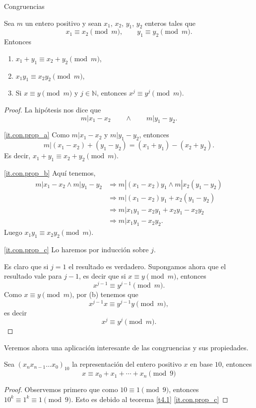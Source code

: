 \begin{section}{Congruencias}
\begin{teorema}\label{t4.1} Sea $m$ un entero positivo y sean $x_1$, $x_2$,
$y_1$, $y_2$ enteros tales que
$$
x_1 \equiv x_2 \pmod{m}, \qquad y_1 \equiv y_2 \pmod{m}.
$$
Entonces
\begin{enumerate}[label=\textit{\alph*)}]
\item\label{it.con.prop_a} $ x_1+ y_1 \equiv x_2+ y_2 \pmod{m}$,
\item\label{it.con.prop_b}  $x_1 y_1 \equiv x_2 y_2 \pmod{m}$,
\item\label{it.con.prop_c}  Si $x \equiv y \pmod{m}$  y $j \in  \mathbb N$, entonces $x^j \equiv y^j \pmod{m}$.
\end{enumerate}
\end{teorema}
\begin{proof}
La hipótesis nos dice que 
\begin{equation*}
    m | x_1 - x_2 \qquad \wedge \qquad m | y_1 - y_2.
\end{equation*}

\ref{it.con.prop_a} Como $m | x_1 - x_2$ y $m | y_1 - y_2$,  entonces 
$$
m |  (x_1 - x_2) + (y_1 - y_2) = (x_1 +y_1) -(x_2+y_2).
$$
Es decir, $ x_1+ y_1 \equiv x_2+ y_2 \pmod{m}$. 

\ref{it.con.prop_b} Aquí tenemos,
$$
\begin{aligned}
    m | x_1 - x_2  \wedge  m | y_1 - y_2 &\Rightarrow m | (x_1 - x_2)y_1  \wedge  m | x_2(y_1 - y_2) \\
    &\Rightarrow m | (x_1 - x_2)y_1 + x_2(y_1 - y_2) \\
    &\Rightarrow m | x_1y_1 - x_2y_1  + x_2y_1 - x_2y_2 \\
    &\Rightarrow m | x_1y_1  - x_2y_2.
\end{aligned}
$$
Luego $ x_1 y_1 \equiv x_2 y_2 \pmod{m}$.

\ref{it.con.prop_c}  Lo haremos por inducción sobre $j$. 

Es claro que si $j=1$ el resultado es verdadero. Supongamos ahora que el resultado vale para $j-1$, es decir que si  $x \equiv y \pmod{m}$, entonces 
$$
x^{j-1} \equiv y^{j-1} \pmod{m}.
$$
Como $x \equiv y \pmod{m}$,  por   { (b)} tenemos que 
$$
x^{j-1}x \equiv y^{j-1}y  \pmod{m},
$$
es decir 
$$
x^j \equiv y^j \pmod{m}.
$$
\end{proof}


Veremos ahora una aplicación interesante de las congruencias y  sus propiedades. 

\begin{proposicion}\label{prop412}
Sea $(x_nx_{n-1}\ldots x_0)_{10}$ la representación del entero positivo $x$ en base $10$, entonces
$$
x \equiv x_0+x_1+\cdots+x_n \pmod{9}
$$
\end{proposicion}
\begin{proof}
 Observemos primero que como $10\equiv 1\pmod{9}$, entonces  $10^k\equiv 1^k \equiv 1\pmod{9}$. Esto es debido  al teorema \ref{t4.1} \ref{it.con.prop_c} 


\end{proof}
\end{section}
